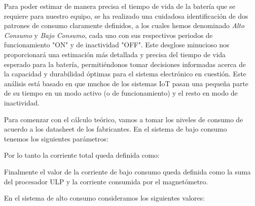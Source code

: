 Para poder estimar de manera precisa el tiempo de vida de la batería que se requiere
para nuestro equipo, se ha realizado una cuidadosa identificación de dos patrones de
consumo claramente definidos, a los cuales hemos denominado \textit{Alto Consumo} y
\textit{Bajo Consumo}, cada uno con sus respectivos periodos de funcionamiento "ON" y de
inactividad "OFF". Este desglose minucioso nos proporcionará una estimación más
detallada y precisa del tiempo de vida esperado para la batería, permitiéndonos tomar
decisiones informadas acerca de la capacidad y durabilidad óptimas para el sistema
electrónico en cuestión. Este análisis está basado en que muchos de los sistemas IoT
pasan una pequeña parte de su tiempo en un modo activo (o de funcionamiento) y el resto
en modo de inactividad.

Para comenzar con el cálculo teórico, vamos a tomar los niveles de consumo de acuerdo a
los datasheet de los fabricantes. En el sistema de bajo consumo tenemos los siguientes
parámetros:


Por lo tanto la corriente total queda definida como:


Finalmente el valor de la corriente de bajo consumo queda definida como la suma del
procesador ULP y la corriente consumida por el magnetómetro.


En el sistema de alto consumo consideramos los siguientes valores:


